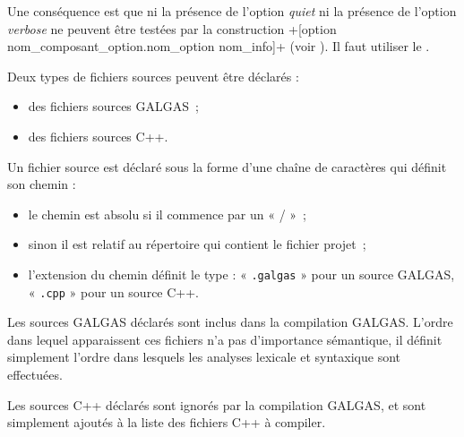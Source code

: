 Une conséquence est que ni la présence de l'option \emph{quiet} ni la présence de l'option \emph{verbose} ne peuvent être testées par la construction \ggst+[option nom_composant_option.nom_option nom_info]+ (voir ). Il faut utiliser le .








Deux types de fichiers sources peuvent être déclarés :
\begin{itemize}
  \item des fichiers sources GALGAS~;
  \item des fichiers sources C++.
\end{itemize}

Un fichier source est déclaré sous la forme d'une chaîne de caractères qui définit son chemin :
\begin{itemize}
\item le chemin est absolu si il commence par un « / »~;
\item sinon il est relatif au répertoire qui contient le fichier projet~;
\item l'extension du chemin définit le type : « \texttt{.galgas} » pour un source GALGAS, « \texttt{.cpp} » pour un source C++.
\end{itemize}

Les sources GALGAS déclarés sont inclus dans la compilation GALGAS. L'ordre dans lequel apparaissent ces fichiers n'a pas d'importance sémantique, il définit simplement l'ordre dans lesquels les analyses lexicale et syntaxique sont effectuées.

Les sources C++ déclarés sont ignorés par la compilation GALGAS, et sont simplement ajoutés à la liste des fichiers C++ à compiler.




